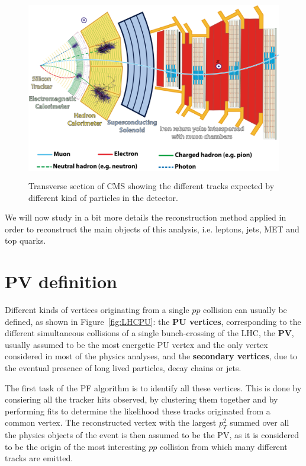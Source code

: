 \documentclass[a4paper, 10pt, openright]{report}
\begin{document}
\begin{figure}[htbp]
\begin{center}
\includegraphics[width=13cm, height=8cm]{figs/CMSIdentify.png}
\caption{Transverse section of \ac{CMS} showing the different tracks expected by different kind of particles in the detector.}
\label{fig:CMSIdentify}
\end{center}
\end{figure}

We will now study in a bit more details the reconstruction method applied in order to reconstruct the main objects of this analysis, i.e. leptons, jets, \ac{MET} and top quarks.

\section{\acf{PV} definition} \label{section:PVDef}

Different kinds of vertices originating from a single $pp$ collision can usually be defined, as shown in Figure~\ref{fig:LHCPU}: the \textbf{\ac{PU} vertices}, corresponding to the different simultaneous collisions of a single bunch-crossing of the \ac{LHC}, the \textbf{\ac{PV}}, usually assumed to be the most energetic \ac{PU} vertex and the only vertex considered in most of the physics analyses, and the \textbf{secondary vertices}, due to the eventual presence of long lived particles, decay chains or jets. 

The first task of the \ac{PF} algorithm is to identify all these vertices. This is done by consiering all the tracker hits observed, by clustering them together and by performing fits to determine the likelihood these tracks originated from a common vertex. The reconstructed vertex with the largest $p_T^2$ summed over all the physics objects of the event is then assumed to be the \ac{PV}, as it is considered to be the origin of the most interesting $pp$ collision from which many different tracks are emitted.
\end{document}
